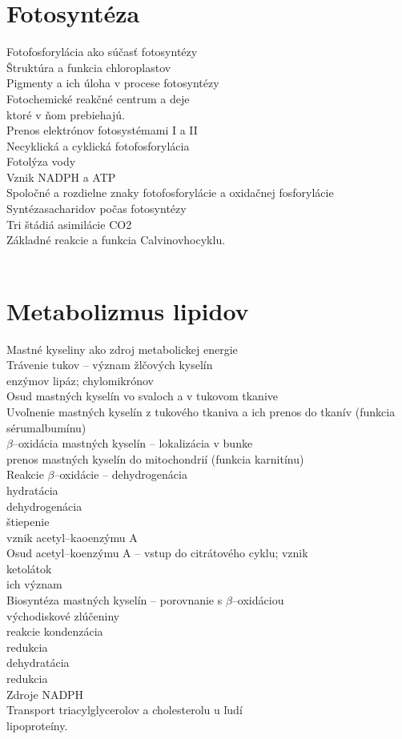 \section{Fotosyntéza}
Fotofosforylácia ako súčasť fotosyntézy\\
Štruktúra a funkcia chloroplastov\\
Pigmenty a ich úloha v procese fotosyntézy\\
Fotochemické reakčné centrum a deje\\
\tab ktoré v ňom prebiehajú.\\
Prenos elektrónov fotosystémami I a II\\
Necyklická a cyklická fotofosforylácia\\
Fotolýza vody\\
Vznik NADPH a ATP\\
Spoločné a rozdielne znaky fotofosforylácie a oxidačnej fosforylácie\\
Syntézasacharidov počas fotosyntézy\\
Tri štádiá asimilácie CO2\\
Základné reakcie a funkcia Calvinovhocyklu.\\
\\
\section{Metabolizmus lipidov}
Mastné kyseliny ako zdroj metabolickej energie\\
Trávenie tukov -- význam žlčových kyselín\\
\tab enzýmov lipáz; chylomikrónov\\
Osud mastných kyselín vo svaloch a v tukovom tkanive\\
Uvoľnenie mastných kyselín z tukového tkaniva a ich prenos do tkanív (funkcia sérumalbumínu)\\
$\beta$--oxidácia mastných kyselín -- lokalizácia v bunke\\
\tab prenos mastných kyselín do mitochondrií (funkcia karnitínu)\\
Reakcie $\beta$--oxidácie -- dehydrogenácia\\
\tab hydratácia\\
\tab dehydrogenácia\\
\tab štiepenie\\
\tab vznik acetyl--kaoenzýmu A\\
Osud acetyl--koenzýmu A -- vstup do citrátového cyklu; vznik\\
ketolátok\\
\tab ich význam\\
Biosyntéza mastných kyselín -- porovnanie s $\beta$--oxidáciou\\
\tab východiskové zlúčeniny\\
\tab reakcie kondenzácia\\
\tab redukcia\\
\tab dehydratácia\\
\tab redukcia\\
Zdroje NADPH\\
Transport triacylglycerolov a cholesterolu u ľudí\\
\tab lipoproteíny.\\
\\
